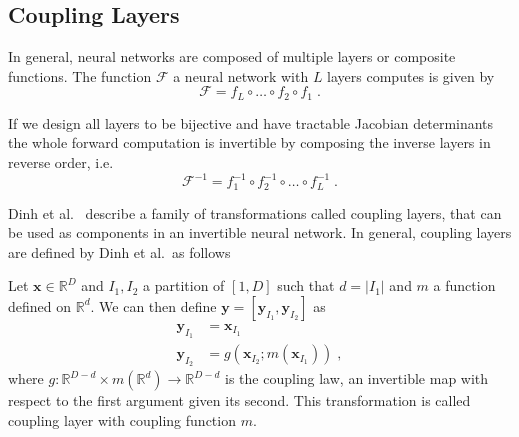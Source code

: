 


\subsection{Coupling Layers}%
\label{sub:coupling_layers}

In general, neural networks are composed of multiple layers or composite
functions. The function $\mathcal{F}$ a neural network with $L$ layers computes
is given by
\begin{equation}%
    \label{eq:neural_network}
    \mathcal{F} = f_L \circ \dots \circ f_2 \circ f_1\;.
\end{equation}

If we design all layers to be bijective and have tractable Jacobian
determinants the whole forward computation is invertible by composing the
inverse layers in reverse order, i.e.
\begin{equation}%
    \label{eq:neural_network_inv}
    \mathcal{F}^{-1} = f_1^{-1} \circ f_2^{-1} \circ \dots \circ f_L^{-1}\;.
\end{equation}

Dinh et al.\ \citep{dinhNICENonlinearIndependent2015} describe a family of transformations
called coupling layers, that can be used as components in an invertible neural
network. In general, coupling layers are defined by Dinh et al.\ as follows

\begin{definition}
    Let $\mathbf{x} \in \mathbb{R}^D$
    and $I_1, I_2$ a partition of $[1, D]$ such that $d = |I_1|$ and $m$ a
    function defined on $\mathbb{R}^d$. We can then define $\mathbf{y} =
    [\mathbf{y}_{I_1}, \mathbf{y}_{I_2}]$ as
    \begin{equation}
        \begin{aligned}%
            \label{eq:coupling_layer_transform}
            \mathbf{y}_{I_1} &= \mathbf{x}_{I_1} \\
            \mathbf{y}_{I_2} &= g(\mathbf{x}_{I_2};m(\mathbf{x}_{I_1}))\;,
        \end{aligned}
    \end{equation}
    where $g: \mathbb{R}^{D-d} \times m(\mathbb{R}^d) \rightarrow
    \mathbb{R}^{D-d}$ is the coupling law, an invertible map with respect to
    the first argument given its second. This transformation is called coupling
    layer with coupling function $m$.
\end{definition}

